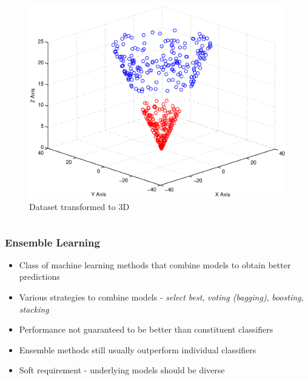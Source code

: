 \documentclass{beamer}
\begin{document}
\begin{frame}
\begin{columns}
{\begin{column}{0.4\textwidth}
\begin{figure}
                        \includegraphics[width=\textwidth]{figures/svm_non_linear_data_3d.eps}
                        \caption{Dataset transformed to 3D}
                    \end{figure}
                \end{column}
            }
        \end{columns}
    \end{frame}
    
    \begin{frame}
        \frametitle{Ensemble Learning}
        \begin{itemize}
            \item{Class of machine learning methods that combine models to obtain better predictions}
            \item{Various strategies to combine models - \emph{select best}, \emph{voting (bagging)}, \emph{boosting}, \emph{stacking}}
            \pause
            \item{Performance not guaranteed to be better than constituent classifiers}
            \item{Ensemble methods still usually outperform individual classifiers}
            \item{Soft requirement - underlying models should be diverse}
        \end{itemize}
    \end{frame}
    
\end{document}
